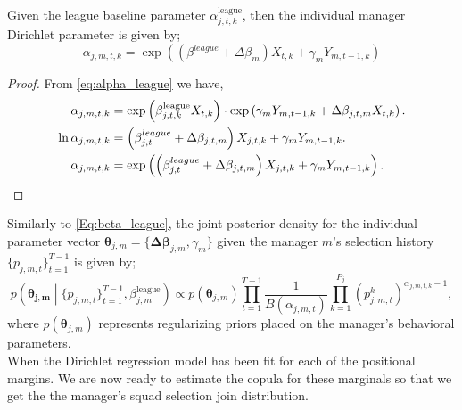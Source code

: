 				\begin{thm}
					Given the league baseline parameter $\alpha^{\text{league}}_{j,t,k}$, then the individual manager Dirichlet parameter is given by;
					\begin{equation}\label{Eq:alpha_m}
						\alpha_{j,m,t,k} = \exp\left( \left(\beta^{league} + \Delta\beta_m\right)X_{t,k} + \gamma_mY_{m,t-1,k}\right)
					\end{equation}
				\end{thm}
				\begin{proof}
					From \ref{eq:alpha_league} we have,
					\[
						\begin{aligned}
							\alpha_{j,m,t,k} &= \exp\left( \beta^{\text{league}}_{j,t,k} X_{t,k} \right) \cdot \exp\left(\gamma_m Y_{m,t-1,k} + \boldmath{\Delta}\beta_{j,t,m}X_{t,k} \right).\\
							\ln\alpha_{j,m,t,k} &= \left( \beta^{league}_{j,t} + \Delta\beta_{j,t,m}\right)X_{j,t,k} + \gamma_mY_{m,t-1,k}.\\
							\alpha_{j,m,t,k} &= \exp\left( \left( \beta^{league}_{j,t} + \Delta\beta_{j,t,m}\right)X_{j,t,k} + \gamma_mY_{m,t-1,k} \right).
						\end{aligned}
					\]

				\end{proof}

				Similarly to \eqref{Eq:beta_league}, the joint posterior density for the individual parameter vector $\boldsymbol{\theta}_{j,m} = \{\boldsymbol{\Delta\beta}_{j,m}, \gamma_m\}$ given the manager $m$'s selection history $\{p_{j,m,t}\}_{t=1}^{T-1}$ is given by;
				\begin{equation}\label{Eq:posterior_manager}
					p\left(\boldsymbol{\theta_{j,m}} \middle| \{p_{j,m,t}\}_{t=1}^{T-1}, \beta_{j,m}^{\text{league}}\right)
					\propto p(\boldsymbol{\theta}_{j,m}) \prod_{t=1}^{T-1} \frac{1}{B(\alpha_{j,m,t})} \prod_{k=1}^{P_j} \left(p_{j,m,t}^k\right)^{\alpha_{j,m,t,k} - 1},
				\end{equation}
				where $p(\boldsymbol{\theta}_{j,m})$ represents regularizing priors placed on the manager's behavioral parameters.\\  %
				When the Dirichlet regression model has been fit for each of the positional margins. We are now ready to estimate the copula for these marginals so that we get the the manager's squad selection join distribution.
